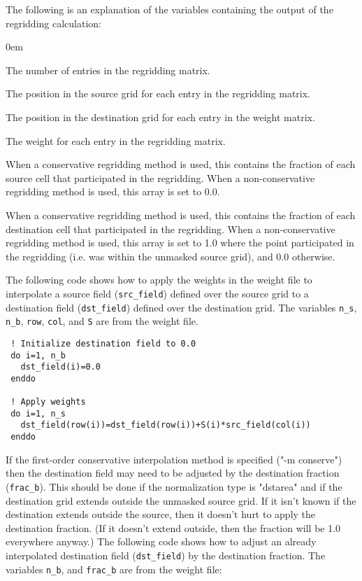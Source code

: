 The following is an explanation of the variables containing the output of the regridding calculation:
\begin{description}
  \itemsep0em
  \item[n\_s] The number of entries in the regridding matrix. 
  \item[col] The position in the source grid for each entry in the regridding matrix. 
  \item[row] The position in the destination grid for each entry in the weight matrix. 
  \item[S] The weight for each entry in the regridding matrix. 
  \item[frac\_a] When a conservative regridding method is used, this contains the fraction of each source cell that participated in the regridding. When a non-conservative regridding method is used, this array is set to 0.0.
  \item[frac\_b] When a conservative regridding method is used, this contains the fraction of each destination cell that participated in the regridding. When a non-conservative regridding method is used, this array is set to 1.0 where the point participated in the regridding (i.e. was within the unmasked source grid), and 0.0 otherwise. 
\end{description}

The following code shows how to apply the weights in the weight file to interpolate a source field ({\tt src\_field}) defined 
over the source grid to a destination field ({\tt dst\_field}) defined over the destination grid. The variables {\tt n\_s}, {\tt n\_b}, 
{\tt row}, {\tt col}, and {\tt S} are from the weight file. 

\begin{verbatim}
 ! Initialize destination field to 0.0
 do i=1, n_b
   dst_field(i)=0.0
 enddo

 ! Apply weights
 do i=1, n_s
   dst_field(row(i))=dst_field(row(i))+S(i)*src_field(col(i))
 enddo
\end{verbatim}

If the first-order conservative interpolation method is specified ("-m conserve") then the destination field may need to be adjusted by the destination fraction ({\tt frac\_b}). 
This should be done if the normalization type is "dstarea" and if the destination grid extends outside the unmasked source grid. If it isn't known if the destination extends outside the source, then it doesn't hurt to apply the destination fraction. (If it doesn't extend outside, then the fraction will be 1.0 everywhere anyway.) 
The following code shows how to adjust an already interpolated destination field ({\tt dst\_field}) by the destination fraction. The variables {\tt n\_b}, and {\tt frac\_b} are from the weight file:

